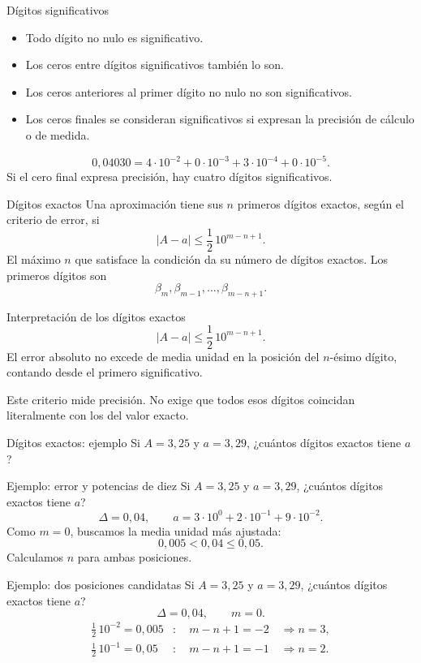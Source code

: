 \documentclass[original_version/main.tex]{subfiles}
\begin{document}
\begin{frame}{Dígitos significativos}
\begin{itemize}\item Todo dígito no nulo es significativo.\item Los ceros entre dígitos significativos también lo son.\item Los ceros anteriores al primer dígito no nulo no son significativos.\item Los ceros finales se consideran significativos si expresan la precisión de cálculo o de medida.\end{itemize}\[0{,}04030=4\cdot10^{-2}+0\cdot10^{-3}+3\cdot10^{-4}+0\cdot10^{-5}.\]Si el cero final expresa precisión, hay cuatro dígitos significativos.
\end{frame}

\begin{frame}{Dígitos exactos}
Una aproximación tiene sus $n$ primeros dígitos exactos, según el criterio de error, si\[\boxed{|A-a|\le\frac12\,10^{m-n+1}.}\]El máximo $n$ que satisface la condición da su número de dígitos exactos. Los primeros dígitos son\[\beta_m,\beta_{m-1},\ldots,\beta_{m-n+1}.\]
\end{frame}

\begin{frame}{Interpretación de los dígitos exactos}
\[|A-a|\le\frac12\,10^{m-n+1}.\]El error absoluto no excede de media unidad en la posición del $n$-ésimo dígito, contando desde el primero significativo.\par\medskip Este criterio mide precisión. No exige que todos esos dígitos coincidan literalmente con los del valor exacto.
\end{frame}

\begin{frame}{Dígitos exactos: ejemplo}
Si $A=3{,}25$ y $a=3{,}29$, ¿cuántos dígitos exactos tiene $a$?
\end{frame}

\begin{frame}{Ejemplo: error y potencias de diez}
Si $A=3{,}25$ y $a=3{,}29$, ¿cuántos dígitos exactos tiene $a$?\[\Delta=0{,}04,\qquad a=3\cdot10^0+2\cdot10^{-1}+9\cdot10^{-2}.\]Como $m=0$, buscamos la media unidad más ajustada:\[0{,}005<0{,}04\le0{,}05.\]Calculamos $n$ para ambas posiciones.
\end{frame}

\begin{frame}{Ejemplo: dos posiciones candidatas}
Si $A=3{,}25$ y $a=3{,}29$, ¿cuántos dígitos exactos tiene $a$?\[\Delta=0{,}04,\qquad m=0.\]\begin{align*}\tfrac12\,10^{-2}=0{,}005&:\quad m-n+1=-2\quad\Longrightarrow n=3,\\\tfrac12\,10^{-1}=0{,}05&:\quad m-n+1=-1\quad\Longrightarrow n=2.\end{align*}
\end{frame}
\end{document}
